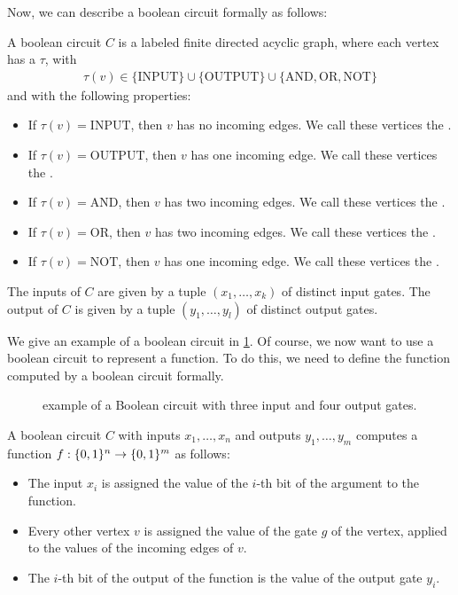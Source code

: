 Now, we can describe a boolean circuit formally as follows:
\begin{definition}
	A boolean circuit $C$ is a labeled finite directed acyclic graph, where each vertex has a  $\tau$, with
	\begin{align*}
		\tau(v) \in \{\text{INPUT}\} \cup \{\text{OUTPUT}\} \cup \{\text{AND}, \text{OR}, \text{NOT}\}
	\end{align*}
	and with the following properties:
	\begin{itemize}
		\item If $\tau(v) = \text{INPUT}$, then $v$ has no incoming edges. We call these vertices the .
		\item If $\tau(v) = \text{OUTPUT}$, then $v$ has one incoming edge. We call these vertices the .
		\item If $\tau(v) = \text{AND}$, then $v$ has two incoming edges. We call these vertices the .
		\item If $\tau(v) = \text{OR}$, then $v$ has two incoming edges. We call these vertices the .
		\item If $\tau(v) = \text{NOT}$, then $v$ has one incoming edge. We call these vertices the .
	\end{itemize}
	The inputs of $C$ are given by a tuple $(x_1, \dots, x_k)$ of distinct input gates. The output of $C$ is given by a tuple $(y_1, \dots, y_l)$ of distinct output gates.
\end{definition}

We give an example of a boolean circuit in \cref{fig:boolean_circuit_example}. Of course, we now want to use a boolean circuit to represent a function. To do this, we need to define the function computed by a boolean circuit formally.

\begin{figure}
	\centering
	\caption[Example of a Boolean Circuit]{example of a Boolean circuit with three input and four output gates.}
	\label{fig:boolean_circuit_example}
\end{figure}

\begin{definition}
	A boolean circuit $C$ with inputs $x_1, \dots, x_n$ and outputs $y_1, \dots, y_m$ computes a function $f : \{0, 1\}^n \rightarrow \{0, 1\}^m$ as follows:
	\begin{itemize}
		\item The input $x_i$ is assigned the value of the $i$-th bit of the argument to the function.
		\item Every other vertex $v$ is assigned the value of the gate $g$ of the vertex, applied to the values of the incoming edges of $v$.
		\item The $i$-th bit of the output of the function is the value of the output gate $y_i$.
	\end{itemize}
\end{definition}

